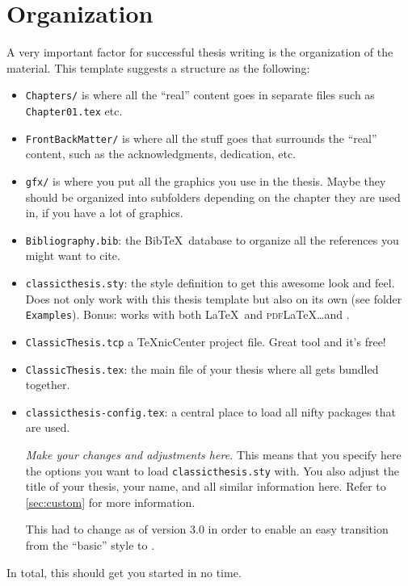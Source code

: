 \section{Organization}
A very important factor for successful thesis writing is the
organization of the material. This template suggests a structure as
the following:
\begin{itemize}
    \item\texttt{Chapters/} is where all the ``real'' content goes in
    separate files such as \texttt{Chapter01.tex} etc.
    \item\texttt{FrontBackMatter/} is where all the stuff goes that
    surrounds the ``real'' content, such as the acknowledgments,
    dedication, etc.
    \item\texttt{gfx/} is where you put all the graphics you use in
    the thesis. Maybe they should be organized into subfolders
    depending on the chapter they are used in, if you have a lot of
    graphics.
    \item\texttt{Bibliography.bib}: the Bib\TeX\ database to organize
    all the references you might want to cite.
    \item\texttt{classicthesis.sty}: the style definition to get this
    awesome look and feel. Does not only work with this thesis template
    but also on its own (see folder \texttt{Examples}). Bonus: works
    with both \LaTeX\ and \textsc{pdf}\LaTeX\dots and \mLyX.
    \item\texttt{ClassicThesis.tcp} a \TeX nicCenter project file.
    Great tool and it's free!
    \item\texttt{ClassicThesis.tex}: the main file of your thesis
    where all gets bundled together.
    \item\texttt{classicthesis-config.tex}: a central place to load all 
    nifty packages that are used. %
    
    \emph{Make your changes and adjustments here.} This means that you  
    specify here the options you want to load \texttt{classicthesis.sty} 
    with. You also adjust the title of your thesis, your name, and all 
    similar information here. Refer to \autoref{sec:custom} for more 
    information.
    
    This had to change as of version 3.0 in order to enable an easy 
    transition from the ``basic'' style to \mLyX.
    
\end{itemize}
In total, this should get you started in no time.


